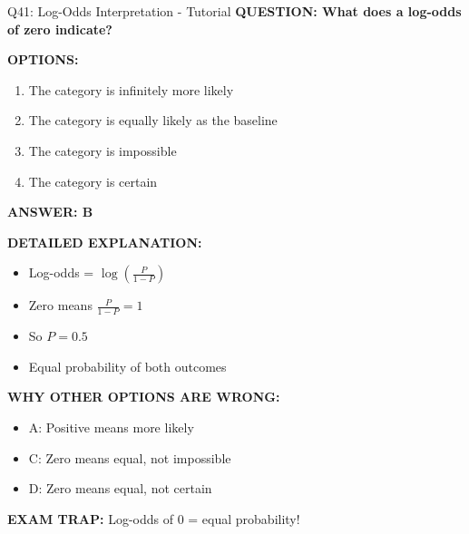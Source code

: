 \documentclass[8pt]{beamer}
\begin{document}
	\begin{frame}{Q41: Log-Odds Interpretation - Tutorial}
		\fontsize{6.5}{7.5}\selectfont
		\textbf{QUESTION: What does a log-odds of zero indicate?}
		
		\vspace{0.1cm}
		\textbf{OPTIONS:}
		\begin{enumerate}
			\item The category is infinitely more likely
			\item The category is equally likely as the baseline
			\item The category is impossible
			\item The category is certain
		\end{enumerate}
		
		\vspace{0.1cm}
		\textcolor{myblue}{\textbf{ANSWER: B}}
		
		\vspace{0.1cm}
		\textbf{DETAILED EXPLANATION:}
		\begin{itemize}
			\item Log-odds = $\log(\frac{P}{1-P})$
			\item Zero means $\frac{P}{1-P} = 1$
			\item So $P = 0.5$
			\item Equal probability of both outcomes
		\end{itemize}
		
		\vspace{0.1cm}
		\textcolor{myred}{\textbf{WHY OTHER OPTIONS ARE WRONG:}}
		\begin{itemize}
			\item \textcolor{myred}{A:} Positive means more likely
			\item \textcolor{myred}{C:} Zero means equal, not impossible
			\item \textcolor{myred}{D:} Zero means equal, not certain
		\end{itemize}
		
		\textcolor{myred}{\textbf{EXAM TRAP:}} Log-odds of 0 = \textcolor{myblue}{equal probability}!
	\end{frame}
	
\end{document}
